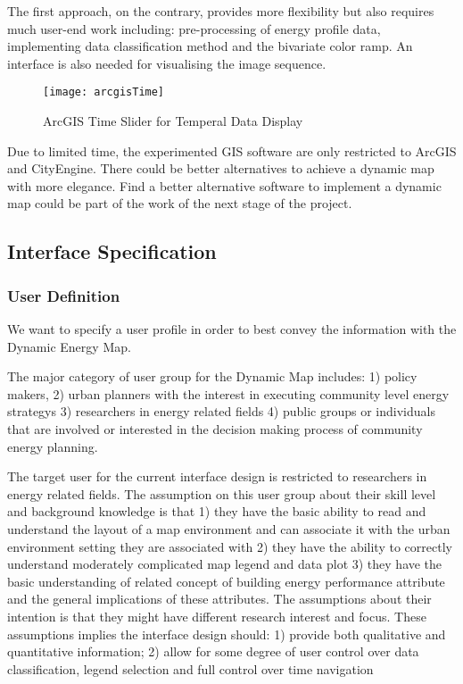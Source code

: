 \documentclass[hidelinks,12pt]{article}
\begin{document}
The first approach, on the contrary, provides more flexibility but
also requires much user-end work including: pre-processing of energy
profile data, implementing data classification method and the
bivariate color ramp. An interface is also needed for visualising the
image sequence.

\begin{figure}[h!]
  \centering
  \texttt{[image: arcgisTime]}
  \caption{ArcGIS Time Slider for Temperal Data Display}
  \label{fig:arcgisTime}
\end{figure}

Due to limited time, the experimented GIS software are only restricted
to ArcGIS and CityEngine. There could be better alternatives to
achieve a dynamic map with more elegance. Find a better alternative
software to implement a dynamic map could be part of the work of the
next stage of the project.

\newpage
\subsection{Interface Specification}\label{interfaceSpec}
\subsubsection{User Definition}
We want to specify a user profile in order to best convey the
information with the Dynamic Energy Map.

The major category of user group for the Dynamic Map includes: 1)
policy makers, 2) urban planners with the interest in executing
community level energy strategys 3) researchers in energy related
fields 4) public groups or individuals that are involved or interested
in the decision making process of community energy planning.

The target user for the current interface design is restricted to
researchers in energy related fields. The assumption on this user
group about their skill level and background knowledge is that 1) they
have the basic ability to read and understand the layout of a map
environment and can associate it with the urban environment setting
they are associated with 2) they have the ability to correctly
understand moderately complicated map legend and data plot 3) they
have the basic understanding of related concept of building energy
performance attribute and the general implications of these
attributes. The assumptions about their intention is that they might
have different research interest and focus. These assumptions implies
the interface design should: 1) provide both qualitative and
quantitative information; 2) allow for some degree of user control
over data classification, legend selection and full control over time
navigation
\end{document}

